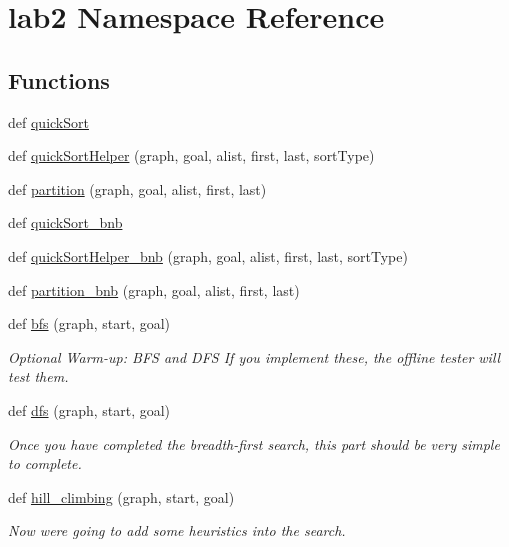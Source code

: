 \hypertarget{namespacelab2}{}\section{lab2 Namespace Reference}
\label{namespacelab2}
\subsection*{Functions}
\begin{DoxyCompactItemize}
\item 
def \hyperlink{namespacelab2_a587fb5e12b9b6bbe5a98a76af303b841}{quick\+Sort}
\item 
def \hyperlink{namespacelab2_a3a1a3b5cfb516d5a9d5ee8bb9e9d1354}{quick\+Sort\+Helper} (graph, goal, alist, first, last, sort\+Type)
\item 
def \hyperlink{namespacelab2_ac92a9ebd5c8b038233463d4d04860d54}{partition} (graph, goal, alist, first, last)
\item 
def \hyperlink{namespacelab2_ac6d556c4bfdfe4909967b690a3fc6a6b}{quick\+Sort\+\_\+bnb}
\item 
def \hyperlink{namespacelab2_af0c98e54367bc2fe44f40db0af6e4b12}{quick\+Sort\+Helper\+\_\+bnb} (graph, goal, alist, first, last, sort\+Type)
\item 
def \hyperlink{namespacelab2_a5a7d465167cf72bb801f8d2918930b2b}{partition\+\_\+bnb} (graph, goal, alist, first, last)
\item 
def \hyperlink{namespacelab2_a344025dfc264b6f4463c871a836954e9}{bfs} (graph, start, goal)
\begin{DoxyCompactList}\small\item\em Optional Warm-\/up\+: B\+F\+S and D\+F\+S If you implement these, the offline tester will test them. \end{DoxyCompactList}\item 
def \hyperlink{namespacelab2_a77ce040b144b3d0ac11ee7a3b247e45e}{dfs} (graph, start, goal)
\begin{DoxyCompactList}\small\item\em Once you have completed the breadth-\/first search, this part should be very simple to complete. \end{DoxyCompactList}\item 
def \hyperlink{namespacelab2_ac34e3ba898541997df325041046f5418}{hill\+\_\+climbing} (graph, start, goal)
\begin{DoxyCompactList}\small\item\em Now we\textquotesingle{}re going to add some heuristics into the search. \end{DoxyCompactList}\item 

\end{DoxyCompactItemize}
